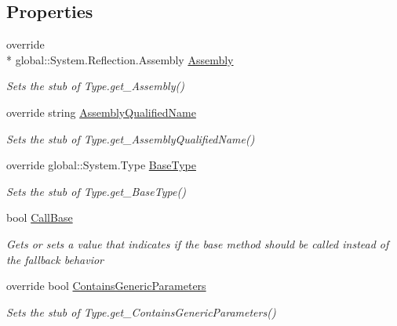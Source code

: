 \subsection*{Properties}
\begin{DoxyCompactItemize}
\item 
override \\*
global\-::\-System.\-Reflection.\-Assembly \hyperlink{class_system_1_1_fakes_1_1_stub_type_ac07d583a84ae3517815638650eda773b}{Assembly}
\begin{DoxyCompactList}\small\item\em Sets the stub of Type.\-get\-\_\-\-Assembly()\end{DoxyCompactList}\item 
override string \hyperlink{class_system_1_1_fakes_1_1_stub_type_a1bdcdf1ca504d3cf6b8dcd8273fe8815}{Assembly\-Qualified\-Name}
\begin{DoxyCompactList}\small\item\em Sets the stub of Type.\-get\-\_\-\-Assembly\-Qualified\-Name()\end{DoxyCompactList}\item 
override global\-::\-System.\-Type \hyperlink{class_system_1_1_fakes_1_1_stub_type_a0238e52b70709094484e3e4c1d68cecc}{Base\-Type}
\begin{DoxyCompactList}\small\item\em Sets the stub of Type.\-get\-\_\-\-Base\-Type()\end{DoxyCompactList}\item 
bool \hyperlink{class_system_1_1_fakes_1_1_stub_type_a83a300e21d728c882abb4ebf7dfa4caa}{Call\-Base}
\begin{DoxyCompactList}\small\item\em Gets or sets a value that indicates if the base method should be called instead of the fallback behavior\end{DoxyCompactList}\item 
override bool \hyperlink{class_system_1_1_fakes_1_1_stub_type_a44b57a8b5fecb2e3f2d79b3c3bb72326}{Contains\-Generic\-Parameters}
\begin{DoxyCompactList}\small\item\em Sets the stub of Type.\-get\-\_\-\-Contains\-Generic\-Parameters()\end{DoxyCompactList}\item 

\end{DoxyCompactItemize}
